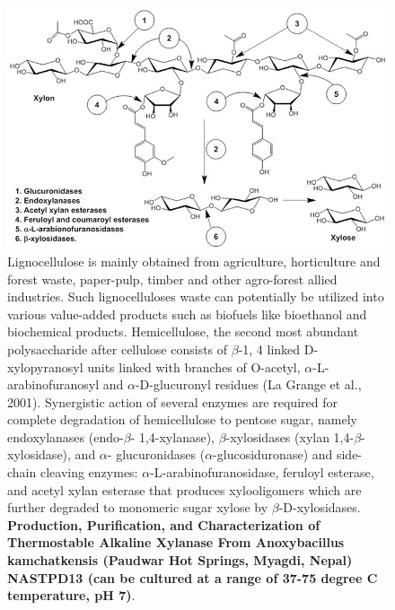 \documentclass[
  ignorenonframetext,
  aspectratio=169]{beamer}
\begin{document}
\begin{frame}{}
\protect\hypertarget{section-4}{}
\scriptsize

\begin{figure}
\includegraphics[width=0.65\linewidth]{../images/thermophilic-bacteria-xylanases} \caption{Lignocellulose is mainly obtained from agriculture, horticulture and forest waste, paper-pulp, timber and other agro-forest allied industries. Such lignocelluloses waste can potentially be utilized into various value-added products such as biofuels like bioethanol and biochemical products. Hemicellulose, the second most abundant polysaccharide after cellulose consists of $\beta$-1, 4 linked D-xylopyranosyl units linked with branches of O-acetyl, $\alpha$-L-arabinofuranosyl and $\alpha$-D-glucuronyl residues (La Grange et al., 2001). Synergistic action of several enzymes are required for complete degradation of hemicellulose to pentose sugar, namely endoxylanases (endo-$\beta$- 1,4-xylanase), $\beta$-xylosidases (xylan 1,4-$\beta$-xylosidase), and $\alpha$- glucuronidases ($\alpha$-glucosiduronase) and side-chain cleaving enzymes: $\alpha$-L-arabinofuranosidase, feruloyl esterase, and acetyl xylan esterase that produces xylooligomers which are further degraded to monomeric sugar xylose by $\beta$-D-xylosidases. \textbf{Production, Purification, and Characterization of Thermostable Alkaline Xylanase From Anoxybacillus kamchatkensis (Paudwar Hot Springs, Myagdi, Nepal) NASTPD13 (can be cultured at a range of 37-75 degree C temperature, pH 7)}.}\label{fig:xylanase-production-purification-nepal}
\end{figure}
\end{frame}
\end{document}

